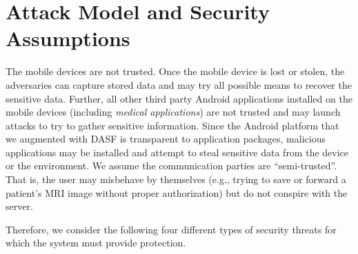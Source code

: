 \section{Attack Model and Security Assumptions}
\begin{comment}
This work focuses on the security challenges of enforcing security
policies on sensitive data sent to Android-based mobile devices and
enforcing dynamic privilege restrictions.
Thus, the security policies of the server and database management
system are out of scope of this study. And we assume that the data is
protected in the server (or cloud) and the database management system
by the appropriate security measures. Furthermore, we assume that the
server ensures that the communication channel between the server and
the application running on the mobile device is secure (e.g., SSL) and
each individual involved in the communication has his/her security
credentials (including digital certificates, public and private key,
etc.) distributed through an out-of-band security channel.  
\end{comment}
The mobile devices are not trusted. Once the mobile device is lost or
stolen, the adversaries can capture stored data and may try all
possible means to recover the sensitive data. Further, all other third
party Android applications installed on the mobile devices (including
\textit{medical applications}) are not trusted and may launch attacks
to try to gather sensitive information. Since the Android platform 
that we augmented with DASF is 
transparent to application packages, malicious applications 
may be installed and attempt to steal sensitive data from the 
device or the environment. We assume the communication 
parties are “semi-trusted”. That is, the user may misbehave by
themselves (e.g., trying to save or forward a patient’s MRI 
image without proper authorization) but do not conspire with 
the server. 

Therefore, we consider the following four different types of security
threats for which the system must provide protection. 

